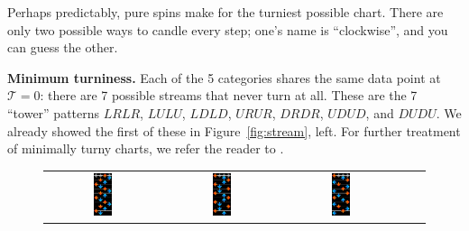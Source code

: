 \documentclass[10pt]{sigplanconf}
\begin{document}
Perhaps predictably, pure spins make for the turniest possible chart. There are only two possible ways to candle every step; one's name is ``clockwise'', and you can guess the other.

{\bf Minimum turniness.}
Each of the 5 categories shares the same data point at $\mathcal{T}=0$: there are 7 possible streams that never turn at all. These are the 7 ``tower'' patterns $LRLR$, $LULU$, $LDLD$, $URUR$, $DRDR$, $UDUD$, and $DUDU$. We already showed the first of these in Figure~\ref{fig:stream}, left. For further treatment of minimally turny charts, we refer the reader to \cite{deltamax}.

\begin{figure}[t]
	\begin{center}
	\begin{tabular}{ccccc}
		\includegraphics[width=0.17\textwidth]{result-1-3-vanilla.png} &
		\includegraphics[width=0.17\textwidth]{result-1-5-xover.png} &
		\includegraphics[width=0.17\textwidth]{result-1-6-lats.png} &

\end{tabular}
\end{center}
\end{figure}
\end{document}
